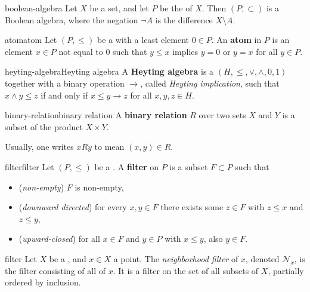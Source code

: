 \begin{example}{boolean-algebra}
    Let $X$ be a set, and let $P$ be the  of $X$. Then $(P, \subset)$ is a Boolean algebra, where the negation $\neg A$ is the difference $X \setminus A$.
\end{example}

\begin{topic}{atom}{atom}
    Let $(P, \le)$ be a  with a least element $0 \in P$. An \textbf{atom} in $P$ is an element $x \in P$ not equal to $0$ such that $y \le x$ implies $y = 0$ or $y = x$ for all $y \in P$.
\end{topic}

\begin{topic}{heyting-algebra}{Heyting algebra}
    A \textbf{Heyting algebra} is a  $(H, \le, \vee, \wedge, 0, 1)$ together with a binary operation $\rightarrow$, called \textit{Heyting implication}, such that $x \wedge y \le z$ if and only if $x \le y \rightarrow z$ for all $x, y, z \in H$.
\end{topic}

\begin{topic}{binary-relation}{binary relation}
    A \textbf{binary relation} $R$ over two sets $X$ and $Y$ is a subset of the product $X \times Y$.
    
    Usually, one writes $x R y$ to mean $(x, y) \in R$.
\end{topic}

\begin{topic}{filter}{filter}
    Let $(P, \le)$ be a . A \textbf{filter} on $P$ is a subset $F \subset P$ such that
    \begin{itemize}
        \item (\textit{non-empty}) $F$ is non-empty,
        \item (\textit{downward directed}) for every $x, y \in F$ there exists some $z \in F$ with $z \le x$ and $z \le y$,
        \item (\textit{upward-closed}) for all $x \in F$ and $y \in P$ with $x \le y$, also $y \in F$.
    \end{itemize}
\end{topic}

\begin{example}{filter}
    Let $X$ be a , and $x \in X$ a point. The \textit{neighborhood filter} of $x$, denoted $\mathcal{N}_x$, is the filter consisting of all  of $x$. It is a filter on the set of all subsets of $X$, partially ordered by inclusion.
\end{example}

